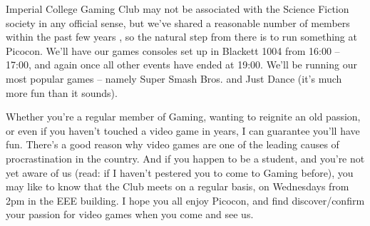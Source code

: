 Imperial College Gaming Club may not be associated with the Science Fiction society in any official sense, but we’ve shared a reasonable number of members within the past few years , so the natural step from there is to run something at Picocon. We’ll have our games consoles set up in Blackett 1004 from 16:00 – 17:00, and again once all other events have ended at 19:00. We’ll be running our most popular games – namely Super Smash Bros. and Just Dance (it’s much more fun than it sounds). 

Whether you’re a regular member of Gaming, wanting to reignite an old passion, or even if you haven’t touched a video game in years, I can guarantee you’ll have fun. There’s a good reason why video games are one of the leading causes of procrastination in the country. And if you happen to be a student, and you’re not yet aware of us (read: if I haven’t pestered you to come to Gaming before), you may like to know that the Club meets on a regular basis, on Wednesdays from 2pm in the EEE building. I hope you all enjoy Picocon, and find discover/confirm your passion for video games when you come and see us.
